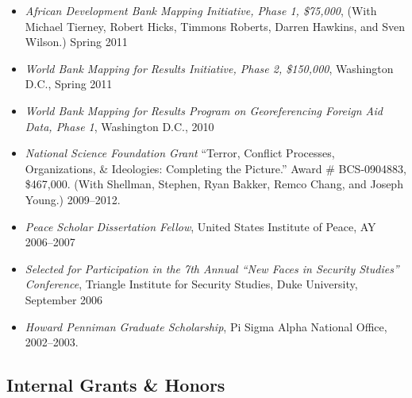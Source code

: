 \documentclass[10pt]{article}
\begin{document}
\begin{itemize}
\item \textit{African Development Bank Mapping Initiative, Phase 1, \$75,000}, (With Michael Tierney, Robert Hicks, Timmons Roberts, Darren Hawkins, and Sven Wilson.) Spring 2011

\item \textit{World Bank Mapping for Results Initiative, Phase 2, \$150,000}, Washington D.C., Spring 2011

\item \textit{World Bank Mapping for Results Program on Georeferencing Foreign Aid Data, Phase 1}, Washington D.C., 2010

\item \textit{National Science Foundation Grant} ``Terror, Conflict Processes, Organizations, \& Ideologies: Completing the Picture.'' Award \# BCS-0904883, \$467,000. (With Shellman, Stephen, Ryan Bakker, Remco Chang, and Joseph Young.) 2009--2012.

\item \emph{Peace Scholar Dissertation Fellow}, United States Institute of Peace, AY 2006--2007

\item \emph{Selected for Participation in the 7th Annual ``New Faces in Security Studies'' Conference},
Triangle Institute for Security Studies, Duke University, September 2006

\item \emph{Howard Penniman Graduate Scholarship}, Pi Sigma Alpha National Office, 2002--2003.

\end{itemize}





\subsection*{Internal Grants \& Honors}
\end{document}
